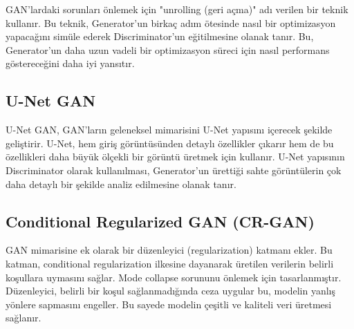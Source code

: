 GAN'lardaki sorunları önlemek için "unrolling (geri açma)" adı verilen bir teknik kullanır. Bu teknik, Generator'un birkaç adım ötesinde nasıl bir optimizasyon yapacağını simüle ederek Discriminator'un eğitilmesine olanak tanır. Bu, Generator'un daha uzun vadeli bir optimizasyon süreci için nasıl performans göstereceğini daha iyi yansıtır. 

\newpage

\subsection{U-Net GAN}

U-Net GAN, GAN’ların geleneksel mimarisini U-Net yapısını içerecek şekilde geliştirir. U-Net, hem giriş görüntüsünden detaylı özellikler çıkarır hem de bu özellikleri daha büyük ölçekli bir görüntü üretmek için kullanır. U-Net yapısının Discriminator olarak kullanılması, Generator'un ürettiği sahte görüntülerin çok daha detaylı bir şekilde analiz edilmesine olanak tanır.

\subsection{Conditional Regularized GAN (CR-GAN)}

GAN mimarisine ek olarak bir düzenleyici (regularization) katmanı ekler. Bu katman, conditional regularization ilkesine dayanarak üretilen verilerin belirli koşullara uymasını sağlar. Mode collapse sorununu önlemek için tasarlanmıştır. Düzenleyici, belirli bir koşul sağlanmadığında ceza uygular bu, modelin yanlış yönlere sapmasını engeller. Bu sayede modelin çeşitli ve kaliteli veri üretmesi sağlanır. 

\newpage
